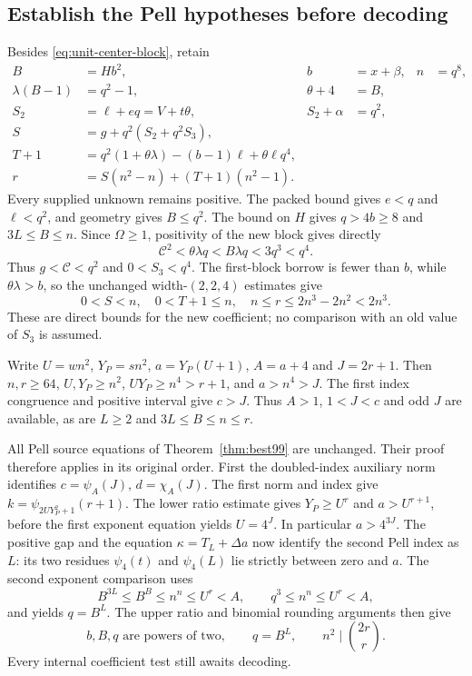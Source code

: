 \subsection{Establish the Pell hypotheses before decoding}

Besides \eqref{eq:unit-center-block}, retain
\begin{align*}
 B&=Hb^2,& b&=x+\beta,&n&=q^8,\\
 \lambda(B-1)&=q^2-1,&\theta+4&=B,\\
 S_2&=\ell+eq=V+t\theta,&S_2+\alpha&=q^2,\\
 S&=g+q^2(S_2+q^2S_3),\\
 T+1&=q^2(1+\theta\lambda)-(b-1)\ell+\theta\ell q^4,\\
 r&=S(n^2-n)+(T+1)(n^2-1).
\end{align*}
Every supplied unknown remains positive. The packed bound gives
$e<q$ and $\ell<q^2$, and geometry gives $B\le q^2$.
The bound on $H$ gives $q>4b\ge8$ and $3L\le B\le n$.
Since $\Omega\ge1$, positivity of the new block gives directly
\[
 \mathcal C^2<\theta\lambda q<B\lambda q<3q^3<q^4.
\]
Thus $g<\mathcal C<q^2$ and $0<S_3<q^4$. The first-block borrow
is fewer than $b$, while $\theta\lambda>b$, so the unchanged
width-$(2,2,4)$ estimates give
\begin{equation}\label{eq:unit-center-ranges}
 0<S<n,\quad0<T+1\le n,\quad
 n\le r\le2n^3-2n^2<2n^3.
\end{equation}
These are direct bounds for the new coefficient; no comparison
with an old value of $S_3$ is assumed.

Write $U=wn^2$, $Y_P=sn^2$, $a=Y_P(U+1)$, $A=a+4$ and $J=2r+1$.
Then $n,r\ge64$, $U,Y_P\ge n^2$, $UY_P\ge n^4>r+1$, and
$a>n^4>J$. The first index congruence and positive interval give
$c>J$. Thus $A>1$, $1<J<c$ and odd $J$ are available, as are
$L\ge2$ and $3L\le B\le n\le r$.

All Pell source equations of Theorem~\ref{thm:best99} are unchanged.
Their proof therefore applies in its original order. First the
doubled-index auxiliary norm identifies $c=\psi_A(J)$,
$d=\chi_A(J)$. The first norm and index give
$k=\psi_{2UY_P^2+1}(r+1)$. The lower ratio estimate gives
$Y_P\ge U^r$ and $a>U^{r+1}$, before the first exponent equation
yields $U=4^J$. In particular $a>4^{3J}$.
The positive gap and the equation $\kappa=T_L+\Delta a$ now
identify the second Pell index as $L$: its two residues
$\psi_4(t)$ and $\psi_4(L)$ lie strictly between zero and $a$.
The second exponent comparison uses
\[
 B^{3L}\le B^B\le n^n\le U^r<A,
 \qquad q^3\le n^n\le U^r<A,
\]
and yields $q=B^L$. The upper ratio and binomial rounding arguments
then give
\begin{equation}\label{eq:unit-center-decoded-powers}
 b,B,q\text{ are powers of two},\qquad
 q=B^L,\qquad n^2\mid\binom{2r}{r}.
\end{equation}
Every internal coefficient test still awaits decoding.

